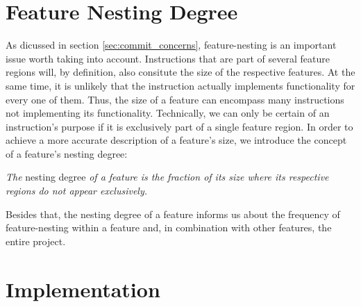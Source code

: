 \section{Feature Nesting Degree}\label{sec:feature_nesting_degree}
As dicussed in section \ref{sec:commit_concerns}, feature-nesting is an important issue worth taking into account.
Instructions that are part of several feature regions will, by definition, also consitute the size of the respective features.
At the same time, it is unlikely that the instruction actually implements functionality for every one of them.
Thus, the size of a feature can encompass many instructions not implementing its functionality.
Technically, we can only be certain of an instruction's purpose if it is exclusively part of a single feature region.
In order to achieve a more accurate description of a feature's size, we introduce the concept of a feature's nesting degree:
\begin{definition} \label{def:feature_nesting_degree}
\emph{The} nesting degree \emph{of a feature is the fraction of its size where its respective regions do not appear exclusively.}
\end{definition}
Besides that, the nesting degree of a feature informs us about the frequency of feature-nesting within a feature and, in combination with other features, the entire project.

\section{Implementation}\label{ch:implementation}

